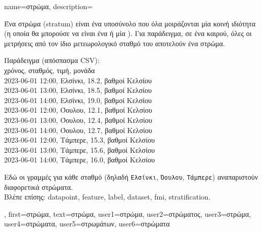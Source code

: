 {name={\foreignlanguage{greek}{στρώμα}},
	description={\foreignlanguage{greek}{Ένα στρώμα} (stratum) \foreignlanguage{greek}{είναι 
		ένα υποσύνολο}  \foreignlanguage{greek}{που όλα μοιράζονται μία κοινή ιδιότητα (η οποία  
		θα μπορούσε να είναι ένα}  \foreignlanguage{greek}{ή μία} ). 
		\foreignlanguage{greek}{Για παράδειγμα, σε ένα}  \foreignlanguage{greek}{καιρού, όλες οι μετρήσεις 
		από τον ίδιο μετεωρολογικό σταθμό του}  \foreignlanguage{greek}{αποτελούν ένα στρώμα}.
		\begin{center}
			\foreignlanguage{greek}{Παράδειγμα} (\foreignlanguage{greek}{απόσπασμα} CSV):\\
  			{\ttfamily
  			\foreignlanguage{greek}{χρόνος, σταθμός, τιμή, μονάδα}\\
  			2023-06-01 12:00, \foreignlanguage{greek}{Ελσίνκι, 18.2, βαθμοί Κελσίου}\\
  			2023-06-01 13:00, \foreignlanguage{greek}{Ελσίνκι, 18.5, βαθμοί Κελσίου}\\
  			2023-06-01 14:00, \foreignlanguage{greek}{Ελσίνκι, 19.0, βαθμοί Κελσίου}\\
  			2023-06-01 12:00, \foreignlanguage{greek}{Όουλου, 12.1, βαθμοί Κελσίου}\\
  			2023-06-01 13:00, \foreignlanguage{greek}{Όουλου, 12.4, βαθμοί Κελσίου}\\
  			2023-06-01 14:00, \foreignlanguage{greek}{Όουλου, 12.7, βαθμοί Κελσίου}\\
  			2023-06-01 12:00, \foreignlanguage{greek}{Τάμπερε, 15.3, βαθμοί Κελσίου}\\
  			2023-06-01 13:00, \foreignlanguage{greek}{Τάμπερε, 15.6, βαθμοί Κελσίου}\\
  			2023-06-01 14:00, \foreignlanguage{greek}{Τάμπερε, 16.0, βαθμοί Κελσίου}
  			}
		\end{center} 
		\foreignlanguage{greek}{Εδώ οι γραμμές για κάθε σταθμό (δηλαδή} \texttt{\foreignlanguage{greek}{Ελσίνκι}}, 
		\texttt{\foreignlanguage{greek}{Όουλου}}, \texttt{\foreignlanguage{greek}{Τάμπερε}}) 
		\foreignlanguage{greek}{αναπαριστούν διαφορετικά στρώματα}.
		\\ 
		\foreignlanguage{greek}{Βλέπε επίσης:} \gls{datapoint}, \gls{feature}, \gls{label}, \gls{dataset}, \gls{fmi}, \gls{stratification}.},
  	first={\foreignlanguage{greek}{στρώμα}},
 	text={\foreignlanguage{greek}{στρώμα}},
	user1={\foreignlanguage{greek}{στρώμα}}, %
	user2={\foreignlanguage{greek}{στρώματος}}, %
	user3={\foreignlanguage{greek}{στρώμα}}, %
	user4={\foreignlanguage{greek}{στρώματα}}, %
	user5={\foreignlanguage{greek}{στρωμάτων}}, %
	user6={\foreignlanguage{greek}{στρώματα}} %
}

